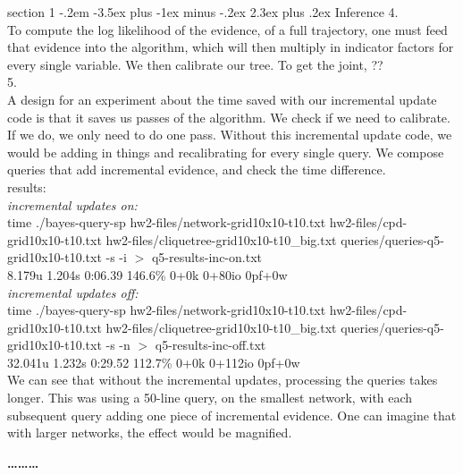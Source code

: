 \documentclass[12pt]{article}
\makeatletter
\newenvironment{problem}{\@startsection
       {section}
       {1}
       {-.2em}
       {-3.5ex plus -1ex minus -.2ex}
       {2.3ex plus .2ex}
       {\pagebreak[3]%
       \large\bf\noindent{Problem }
       }
       }
       {%
       \begin{center}\large\bf \ldots\ldots\ldots\end{center}}
\makeatother
\begin{document}
\begin{problem}{Inference}
4.\\
To compute the log likelihood of the evidence, of a full trajectory, one must feed that evidence into the algorithm, which will then multiply in indicator factors for every single variable.  We then calibrate our tree.  To get the joint, ?? \\

5.\\
A design for an experiment about the time saved with our incremental update code is that it saves us passes of the algorithm.  We check if we need to calibrate.  If we do, we only need to do one pass.  Without this incremental update code, we would be adding in things and recalibrating for every single query.  We compose queries that add incremental evidence, and check the time difference.\\
\noindent results:\\
\noindent \textit{incremental updates on:}\\
time ./bayes-query-sp hw2-files/network-grid10x10-t10.txt hw2-files/cpd-grid10x10-t10.txt hw2-files/cliquetree-grid10x10-t10\_big.txt queries/queries-q5-grid10x10-t10.txt -s -i $>$ q5-results-inc-on.txt\\
8.179u 1.204s 0:06.39 146.6\%    0+0k 0+80io 0pf+0w\\
\noindent \textit{incremental updates off:}\\
time ./bayes-query-sp hw2-files/network-grid10x10-t10.txt hw2-files/cpd-grid10x10-t10.txt hw2-files/cliquetree-grid10x10-t10\_big.txt queries/queries-q5-grid10x10-t10.txt -s -n  $>$ q5-results-inc-off.txt\\
32.041u 1.232s 0:29.52 112.7\%   0+0k 0+112io 0pf+0w\\

We can see that without the incremental updates, processing the queries takes longer.  This was using a 50-line query, on the smallest network, with each subsequent query adding one piece of incremental evidence.  One can imagine that with larger networks, the effect would be magnified.

\end{problem}{}
\end{document}
